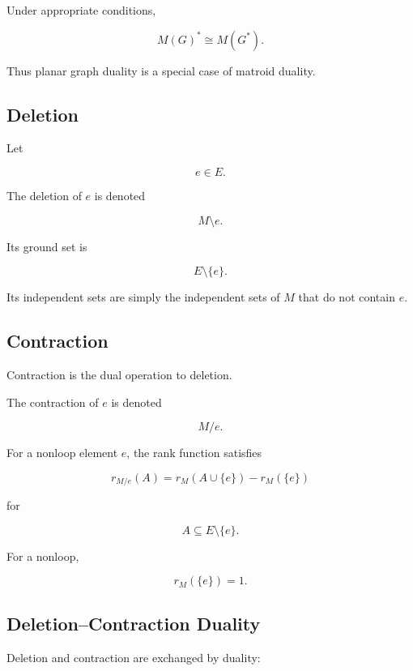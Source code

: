 Under appropriate conditions,

\[
\boxed{
M(G)^*
\cong
M(G^*).
}
\]

Thus planar graph duality is a special case of matroid duality.

\subsection{Deletion}
\label{subsec:matroid-deletion}

Let

\[
e\in E.
\]

The deletion of \(e\) is denoted

\[
\boxed{
M\setminus e.
}
\]

Its ground set is

\[
E\setminus\{e\}.
\]

Its independent sets are simply the independent sets of \(M\) that do
not contain \(e\).

\subsection{Contraction}
\label{subsec:matroid-contraction}

Contraction is the dual operation to deletion.

The contraction of \(e\) is denoted

\[
\boxed{
M/e.
}
\]

For a nonloop element \(e\), the rank function satisfies

\[
\boxed{
r_{M/e}(A)
=
r_M(A\cup\{e\})-r_M(\{e\})
}
\]

for

\[
A\subseteq E\setminus\{e\}.
\]

For a nonloop,

\[
r_M(\{e\})=1.
\]

\subsection{Deletion--Contraction Duality}
\label{subsec:deletion-contraction-duality}

Deletion and contraction are exchanged by duality:

